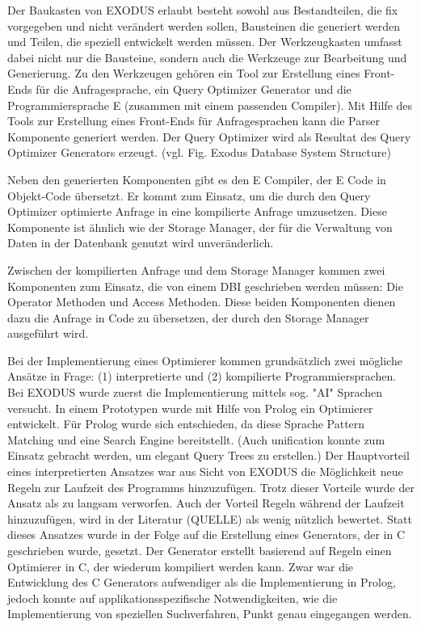 Der Baukasten von EXODUS erlaubt besteht sowohl aus Bestandteilen, die fix vorgegeben und nicht verändert werden sollen, Bausteinen die generiert werden und Teilen, die speziell entwickelt werden müssen. Der Werkzeugkasten umfasst dabei nicht nur die Bausteine, sondern auch die Werkzeuge zur Bearbeitung und Generierung. Zu den Werkzeugen gehören ein Tool zur Erstellung eines Front-Ends für die Anfragesprache, ein Query Optimizer Generator und die Programmiersprache E (zusammen mit einem passenden Compiler). Mit Hilfe des Tools zur Erstellung eines Front-Ends für Anfragesprachen kann die Parser Komponente generiert werden. Der Query Optimizer wird als Resultat des Query Optimizer Generators erzeugt. (vgl. Fig. Exodus Database System Structure)

Neben den generierten Komponenten gibt es den E Compiler, der E Code in Objekt-Code übersetzt. Er kommt zum Einsatz, um die durch den Query Optimizer optimierte Anfrage in eine kompilierte Anfrage umzusetzen. Diese Komponente ist ähnlich wie der Storage Manager, der für die Verwaltung von Daten in der Datenbank genutzt wird unveränderlich. 

Zwischen der kompilierten Anfrage und dem Storage Manager kommen zwei Komponenten zum Einsatz, die von einem DBI geschrieben werden müssen: Die Operator Methoden und Access Methoden. Diese beiden Komponenten dienen dazu die Anfrage in Code zu übersetzen, der durch den  Storage Manager ausgeführt wird.

Bei der Implementierung eines Optimierer kommen grundsätzlich zwei mögliche Ansätze in Frage: (1) interpretierte und (2) kompilierte Programmiersprachen. Bei EXODUS wurde zuerst die Implementierung mittels sog. "AI" Sprachen versucht. In einem Prototypen wurde mit Hilfe von Prolog ein Optimierer entwickelt. Für Prolog wurde sich entschieden, da diese Sprache Pattern Matching und eine Search Engine bereitstellt. (Auch unification konnte zum Einsatz gebracht werden, um elegant Query Trees zu erstellen.) Der Hauptvorteil eines interpretierten Ansatzes war aus Sicht von EXODUS die Möglichkeit neue Regeln zur Laufzeit des Programms hinzuzufügen. Trotz dieser Vorteile wurde der Ansatz als zu langsam verworfen. Auch der Vorteil Regeln während der Laufzeit hinzuzufügen, wird in der Literatur (QUELLE) als wenig nützlich bewertet. Statt dieses Ansatzes wurde in der Folge auf die Erstellung eines Generators, der in C geschrieben wurde, gesetzt. Der Generator erstellt basierend auf Regeln einen Optimierer in C, der wiederum kompiliert werden kann. Zwar war die Entwicklung des C Generators aufwendiger als die Implementierung in Prolog, jedoch konnte auf applikationsspezifische Notwendigkeiten, wie die Implementierung von speziellen Suchverfahren, Punkt genau eingegangen werden.


